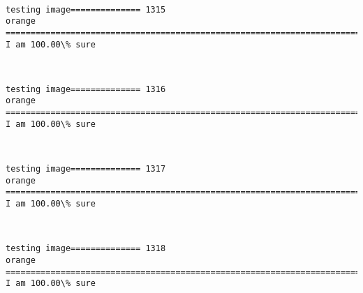 \documentclass[11pt]{article}
\begin{document}
    \begin{center}
    \end{center}
    { \hspace*{\fill} \\}
    
    \begin{Verbatim}[commandchars=\\\{\}]
testing image============== 1315
orange
============================================================================
I am 100.00\% sure

    \end{Verbatim}

    \begin{center}
    \end{center}
    { \hspace*{\fill} \\}
    
    \begin{Verbatim}[commandchars=\\\{\}]
testing image============== 1316
orange
============================================================================
I am 100.00\% sure

    \end{Verbatim}

    \begin{center}
    \end{center}
    { \hspace*{\fill} \\}
    
    \begin{Verbatim}[commandchars=\\\{\}]
testing image============== 1317
orange
============================================================================
I am 100.00\% sure

    \end{Verbatim}

    \begin{center}
    \end{center}
    { \hspace*{\fill} \\}
    
    \begin{Verbatim}[commandchars=\\\{\}]
testing image============== 1318
orange
============================================================================
I am 100.00\% sure

    \end{Verbatim}
\end{document}
